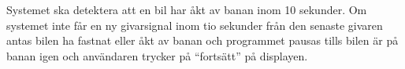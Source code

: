 Systemet ska detektera att en bil har åkt av banan inom 10 sekunder. Om systemet
inte får en ny givarsignal inom tio sekunder från den senaste givaren antas bilen ha
fastnat eller åkt av banan och programmet pausas tills bilen är på banan igen
och användaren trycker på ``fortsätt'' på displayen.

